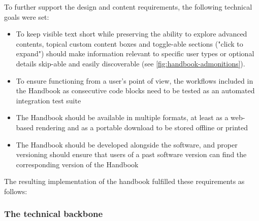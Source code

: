 To further support the design and content requirements, the following technical goals were set:

\begin{itemize}
	\item To keep visible text short while preserving the ability to explore advanced contents, topical custom content boxes and toggle-able sections ("click to expand") should make information relevant to specific user types or optional details skip-able and easily discoverable (see \cref{fig:handbook-admonitions}).
	\item To ensure functioning from a user's point of view, the workflows included in the Handbook as consecutive code blocks need to be tested as an automated integration test suite
	\item The Handbook should be available in multiple formats, at least as a web-based rendering and as a portable download to be stored offline or printed
	\item The Handbook should be developed alongside the software, and proper versioning should ensure that users of a past software version can find the corresponding version of the Handbook
\end{itemize}

The resulting implementation of the handbook fulfilled these requirements as follows:


\subsubsection{The technical backbone}

